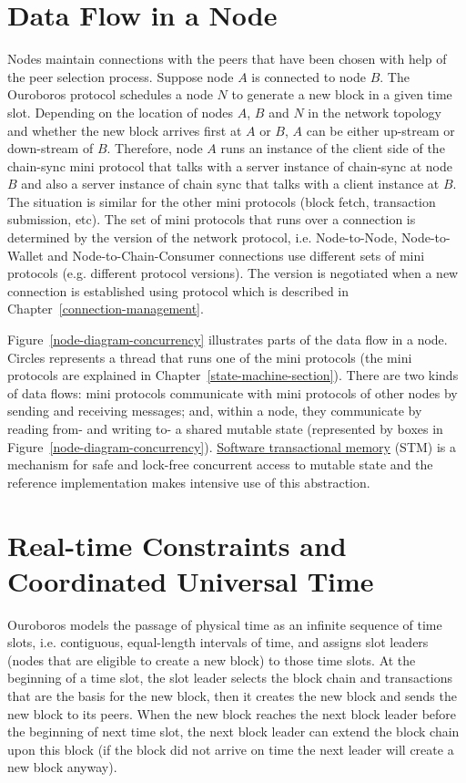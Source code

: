 \documentclass{report}
\newcommand{\hide}[1]{}
\theoremstyle{definition}{
  \newtheorem{lemma}{Lemma}[section] %
  \newtheorem{definition}[lemma]{Definition}
}
\theoremstyle{theorem}{
  \newtheorem{invariant}[lemma]{Invariant}
  \newtheorem{proofobligation}[lemma]{Proof Obligation}
}
\numberwithin{equation}{lemma}
\begin{document}
\section{Data Flow in a Node}
Nodes maintain connections with the peers that have been chosen
with help of the peer selection process.
Suppose node $A$ is connected to node $B$.
The Ouroboros protocol schedules a node $N$ to generate a new block in a given time slot.
Depending on the location of nodes $A$, $B$ and $N$ in the network topology and whether the new
block arrives first at $A$ or $B$, $A$ can be either up-stream or down-stream of $B$.
Therefore, node $A$ runs an instance of the client side of the chain-sync mini protocol
that talks with a server instance of chain-sync at node $B$ and also a server instance of chain sync
that talks with a client instance at $B$.
The situation is similar for the other mini protocols (block fetch, transaction submission, etc).
The set of mini protocols that runs over a connection is determined by the version of the network
protocol, i.e.  Node-to-Node, Node-to-Wallet and Node-to-Chain-Consumer
connections use different sets of mini protocols (e.g. different protocol
versions).  The version is negotiated when a new connection is established
using protocol which is described in Chapter~\ref{connection-management}.
\hide{Add description of this protocol in Chapter~\ref{connection-management}
and link it.}

Figure~\ref{node-diagram-concurrency} illustrates parts of the data flow in a node.
Circles represents a thread that runs one of the mini protocols (the mini protocols are explained in
Chapter~\ref{state-machine-section}).
There are two kinds of data flows:
mini protocols communicate with mini protocols of other nodes by sending and receiving messages;
and, within a node, they communicate by reading from- and writing to- a shared
mutable state (represented by boxes in Figure~\ref{node-diagram-concurrency}).
\href{https://en.wikipedia.org/wiki/Software_transactional_memory}{Software transactional memory}
(STM) is a mechanism for safe and lock-free concurrent
access to mutable state and the reference implementation makes intensive use of this abstraction.

\section{Real-time Constraints and Coordinated Universal Time}
Ouroboros models the passage of physical time as an infinite sequence of time slots,
i.e. contiguous, equal-length intervals of time,
and assigns slot leaders (nodes that are eligible to create a new block) to those time slots.
At the beginning of a time slot, the slot leader selects the block chain and transactions that are the basis
for the new block, then it creates the new block and sends the new block to its peers.
When the new block reaches the next block leader before the beginning of next time slot,
the next block leader can extend the block chain upon this block (if the block
did not arrive on time the next leader will create a new block anyway).
\end{document}
